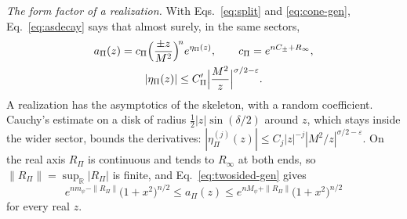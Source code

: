 \documentclass[a4paper,11pt]{article}
\newcommand{\bR}{\mathbb{R}}
\begin{document}
\textit{The form factor of a realization.} With Eqs.~\eqref{eq:split} and \eqref{eq:cone-gen}, Eq.~\eqref{eq:asdecay} says that almost surely, in the same sectors,
\begin{equation}
\label{eq:cone-real}
\begin{gathered}
a_\Pi(z)=c_\Pi\Bigl(\frac{\pm z}{M^2}\Bigr)^{\!n}e^{\eta_\Pi(z)},\qquad c_\Pi=e^{nC_\pm+R_\infty},\\
|\eta_\Pi(z)|\le C'_\Pi\Bigl|\frac{M^2}z\Bigr|^{\sigma/2-\varepsilon}.
\end{gathered}
\end{equation}
A realization has the asymptotics of the skeleton, with a random coefficient. Cauchy's estimate on a disk of radius $\frac12|z|\sin(\delta/2)$ around $z$, which stays inside the wider sector, bounds the derivatives: $|\eta_\Pi^{(j)}(z)|\le C_j|z|^{-j}|M^2/z|^{\sigma/2-\varepsilon}$. On the real axis $R_\Pi$ is continuous and tends to $R_\infty$ at both ends, so $\|R_\Pi\|=\sup_{\bR}|R_\Pi|$ is finite, and Eq.~\eqref{eq:twosided-gen} gives
\begin{equation}
\label{eq:twosided-real}
e^{nm_\psi-\|R_\Pi\|}\bigl(1+x^2\bigr)^{n/2}\le a_\Pi(z)\le e^{nM_\psi+\|R_\Pi\|}\bigl(1+x^2\bigr)^{n/2}
\end{equation}
for every real $z$.
\end{document}
